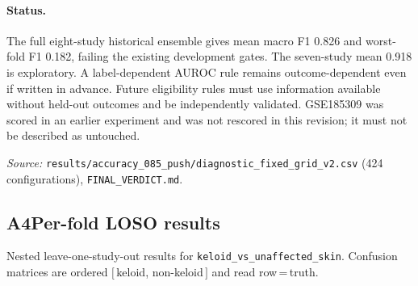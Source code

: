 \paragraph{Status.} The full eight-study historical ensemble gives mean
macro F1 0.826 and worst-fold F1 0.182, failing the existing development gates.
The seven-study mean 0.918 is exploratory. A label-dependent AUROC rule remains
outcome-dependent even if written in advance. Future eligibility rules must
use information available without held-out outcomes and be independently validated.
GSE185309 was scored in an earlier experiment and was not rescored in this
revision; it must not be described as untouched.

\medskip
\noindent\textit{Source:}
\texttt{results/accuracy\_085\_push/diagnostic\_fixed\_grid\_v2.csv} (424
configurations), \texttt{FINAL\_VERDICT.md}.

\subsection*{A4\quad Per-fold LOSO results}
\label{app:perfold}

Nested leave-one-study-out results for
\texttt{keloid\_vs\_unaffected\_skin}. Confusion matrices are ordered
$[\,$keloid, non-keloid$\,]$ and read row\,=\,truth.

